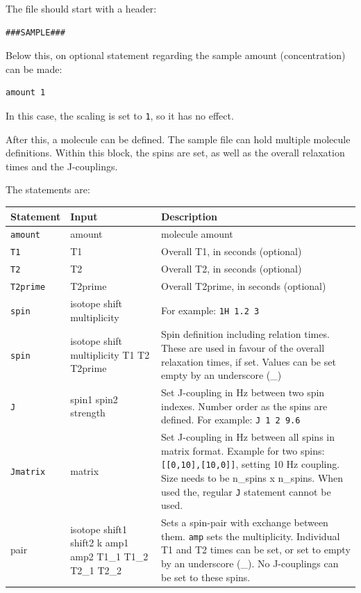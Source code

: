 \documentclass[11pt,a4paper]{article}
\begin{document}
The file should start with a header:
\begin{verbatim}
###SAMPLE###
\end{verbatim}
Below this, on optional statement regarding the sample amount (concentration) can be made:

\begin{verbatim}
amount 1 
\end{verbatim}
In this case, the scaling is set to \texttt{1}, so it has no effect.

After this, a molecule can be defined. The sample file can hold multiple molecule definitions. Within this block, the spins are set, as well as the overall relaxation times and the J-couplings.

The statements are:

\begin{center}
\begin{tabular}{lp{5cm}p{6cm}}
\toprule
\textbf{Statement} & \textbf{Input} & \textbf{Description} \\
\midrule
\rowcolor{gray!30!white}
\texttt{amount} & amount & molecule amount\\
\texttt{T1} & T1 & Overall T1, in seconds (optional)\\
\rowcolor{gray!30!white}
\texttt{T2} & T2 & Overall T2, in seconds (optional)\\
\texttt{T2prime} & T2prime & Overall T2prime, in seconds (optional)\\
\rowcolor{gray!30!white}
\texttt{spin} & isotope shift multiplicity & For example: \texttt{1H 1.2 3}\\
\texttt{spin} & isotope shift multiplicity T1 T2 T2prime & Spin definition including relation times. These are used in favour of the overall relaxation times, if set. Values can be set empty by an underscore (\_) \\
\rowcolor{gray!30!white}
\texttt{J} & spin1 spin2 strength & Set J-coupling in Hz between two spin indexes. Number order as the spins are defined. For example: \texttt{J 1 2 9.6}\\
\texttt{Jmatrix} & matrix & Set J-coupling in Hz between all spins in matrix format. Example for two spins: \texttt{[[0,10],[10,0]]}, setting 10 Hz coupling. Size needs to be n\_spins x n\_spins. When used the, regular \texttt{J} statement cannot be used.\\
\rowcolor{gray!30!white}
pair & isotope shift1 shift2 k amp1 amp2 T1\_1 T1\_2 T2\_1 T2\_2 &  Sets a spin-pair with exchange between them. \texttt{amp} sets the multiplicity. Individual T1 and T2 times can be set, or set to empty by an underscore (\_). No J-couplings can be set to these spins.\\
\bottomrule
\end{tabular}
\end{center}
\end{document}
